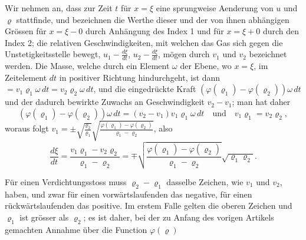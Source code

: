 \documentclass[12pt,a4paper]{book}
\theoremstyle{definition}
\theoremstyle{remark}
\begin{document}
Wir nehmen an, dass zur Zeit $t$ f\"ur $x = \xi$ eine sprungweise Aenderung von $u$ und $\varrho$ stattfinde, und bezeichnen die Werthe dieser und der von ihnen abh\"angigen Gr\"ossen f\"ur $x = \xi - 0$ durch Anh\"angung des Index 1 und f\"ur $x = \xi + 0$ durch den Index 2; die relativen Geschwindigkeiten, mit welchen das Gas sich gegen die Unstetigkeitsstelle bewegt, $u_{1} - \frac{d\xi}{dt}$, $u_{2} - \frac{d\xi}{dt}$, m\"ogen durch $v_{1}$ und $v_{2}$ bezeichnet werden. Die Masse, welche durch ein Element $\omega$ der Ebene, wo $x = \xi$, im Zeitelement $dt$ in positiver Richtung hindurchgeht, ist dann $= v_{1}\varrho_{1}\omega\,dt = v_{2}\varrho_{2}\omega\,dt$, und die eingedr\"uckte Kraft $(\varphi(\varrho_{1}) - \varphi(\varrho_{2}))\omega\,dt$ und der dadurch bewirkte Zuwachs an Geschwindigkeit $v_{2} - v_{1}$; man hat daher
\[
(\varphi(\varrho_{1}) - \varphi(\varrho_{2}))\omega\,dt = (v_{2} - v_{1})v_{1}\varrho_{1}\omega\,dt\quad\text{und}\quad v_{1}\varrho_{1} = v_{2}\varrho_{2},
\]
woraus folgt $v_{1} = \pm\sqrt{\frac{\varrho_{2}}{\varrho_{1}}}\sqrt{\frac{\varphi(\varrho_{1}) - \varphi(\varrho_{2})}{\varrho_{1} - \varrho_{2}}}$, also
\[
\frac{d\xi}{dt} = \frac{v_{1}\varrho_{1} - v_{2}\varrho_{2}}{\varrho_{1} - \varrho_{2}} = \mp\sqrt{\frac{\varphi(\varrho_{1}) - \varphi(\varrho_{2})}{\varrho_{1} - \varrho_{2}}}\sqrt{\varrho_{1}\varrho_{2}}.\tag{1}
\]

F\"ur einen Verdichtungsstoss muss $\varrho_{2} - \varrho_{1}$ dasselbe Zeichen, wie $v_{1}$ und $v_{2}$, haben, und zwar f\"ur einen vorw\"artslaufenden das negative, f\"ur einen r\"uckw\"artslaufenden das positive. Im erstem Falle gelten die oberen Zeichen und $\varrho_{1}$ ist gr\"osser als $\varrho_{2}$; es ist daher, bei der zu Anfang des vorigen Artikels gemachten Annahme \"uber die Function $\varphi(\varrho)$
\end{document}
